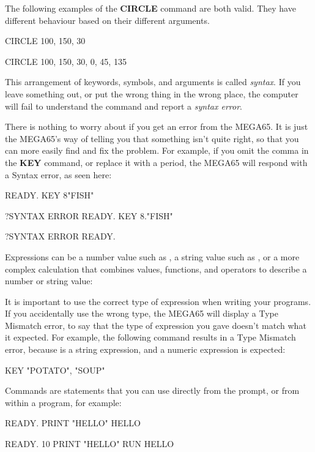 The following examples of the {\bf CIRCLE} command are both valid. They have different behaviour based on their different arguments.

\begin{screencode}
CIRCLE 100, 150, 30

CIRCLE 100, 150, 30, 0, 45, 135
\end{screencode}

This arrangement of keywords, symbols, and arguments is called {\em syntax}. If you leave something out, or put the wrong thing in the wrong place, the computer will fail to understand the command and report a {\em syntax error}.

There is nothing to worry about if you get an error from the MEGA65. It is just the MEGA65's way of telling you that something isn't quite right, so that you can more easily find and fix the problem. For example, if you omit the comma in the {\bf KEY} command, or replace it with a period, the MEGA65 will respond with a Syntax error, as seen here:

\begin{screencode}
READY.
KEY 8"FISH"

?SYNTAX ERROR
READY.
KEY 8."FISH"

?SYNTAX ERROR
READY.
\end{screencode}

Expressions can be a number value such as , a string value such as , or a more complex calculation that combines values, functions, and operators to describe a number or string value: 

It is important to use the correct type of expression when writing your programs. If you accidentally use the wrong type, the MEGA65 will display a Type Mismatch error, to say that the type of expression you gave doesn't match what it expected. For example, the following command results in a Type Mismatch error, because  is a string expression, and a numeric expression is expected:

\begin{screencode}
KEY "POTATO", "SOUP"
\end{screencode}

Commands are statements that you can use directly from the  prompt, or from within a program, for example:

\begin{screencode}
READY.
PRINT "HELLO"
HELLO

READY.
10 PRINT "HELLO"
RUN
HELLO
\end{screencode}

